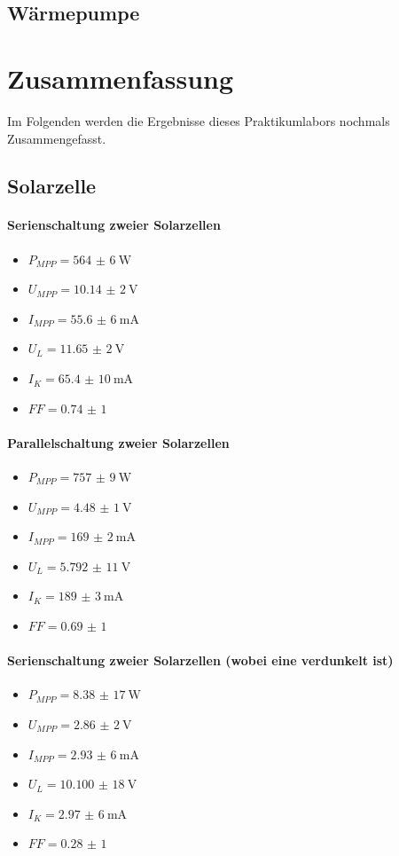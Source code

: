 \documentclass[english, ngerman]{scrartcl}
\begin{document}
\subsection{Wärmepumpe}
\label{subsec:diskussion_waermepumpe}


\section{Zusammenfassung}
\label{sec:zusammenfassung}
Im Folgenden werden die Ergebnisse dieses Praktikumlabors nochmals Zusammengefasst. 
\subsection{Solarzelle}
\label{subsec:zusammenfassung_solar}
\paragraph{Serienschaltung zweier Solarzellen}
\begin{itemize}
    \item $P_{MPP} = \SI{564(6)}{\watt}$
    \item $U_{MPP} = \SI{10,14(2)}{\volt}$
    \item $I_{MPP} = \SI{55,6(6)}{\milli\ampere}$
    \item $U_{L} = \SI{11,65(2)}{\volt}$
    \item $I_{K} = \SI{65,4(10)}{\milli\ampere}$
    \item $FF = \num{0,74(1)}$
\end{itemize}
\paragraph{Parallelschaltung zweier Solarzellen}
\begin{itemize}
    \item $P_{MPP} = \SI{757(9)}{\watt}$
    \item $U_{MPP} = \SI{4,48(1)}{\volt}$
    \item $I_{MPP} = \SI{169(2)}{\milli\ampere}$
    \item $U_{L} = \SI{5,792(11)}{\volt}$
    \item $I_{K} = \SI{189(3)}{\milli\ampere}$
    \item $FF = \num{0,69(1)}$
\end{itemize}
\paragraph{Serienschaltung zweier Solarzellen (wobei eine verdunkelt ist)}
\begin{itemize}
    \item $P_{MPP} = \SI{8,38(17)}{\watt}$
    \item $U_{MPP} = \SI{2,86(2)}{\volt}$
    \item $I_{MPP} = \SI{2,93(6)}{\milli\ampere}$
    \item $U_{L} = \SI{10,100(18)}{\volt}$
    \item $I_{K} = \SI{2,97(6)}{\milli\ampere}$
    \item $FF = \num{0,28(1)}$
\end{itemize}
\end{document}
